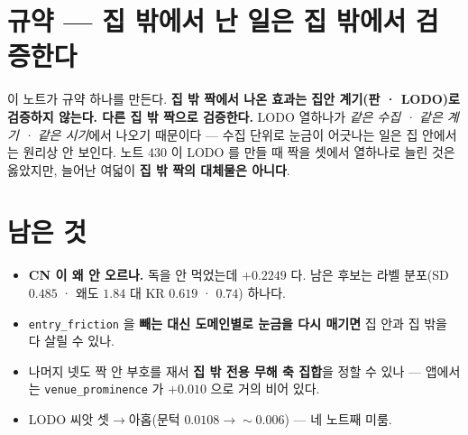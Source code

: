 \documentclass[11pt]{article}
\begin{document}
\section*{규약 --- 집 밖에서 난 일은 집 밖에서 검증한다}

이 노트가 규약 하나를 만든다. \textbf{집 밖 짝에서 나온 효과는 집안
계기(판 · LODO)로 검증하지 않는다. 다른 집 밖 짝으로 검증한다.} LODO
열하나가 \emph{같은 수집 · 같은 계기 · 같은 시기}에서 나오기 때문이다 ---
수집 단위로 눈금이 어긋나는 일은 집 안에서는 원리상 안 보인다. 노트 430 이
LODO 를 만들 때 짝을 셋에서 열하나로 늘린 것은 옳았지만, 늘어난 여덟이
\textbf{집 밖 짝의 대체물은 아니다}.

\section*{남은 것}

\begin{itemize}
\item \textbf{CN 이 왜 안 오르나.} 독을 안 먹었는데 $+0.2249$ 다. 남은
후보는 라벨 분포(SD $0.485$ · 왜도 $1.84$ 대 KR $0.619$ · $0.74$) 하나다.
\item \texttt{entry\_friction} 을 \textbf{빼는 대신 도메인별로 눈금을
다시 매기면} 집 안과 집 밖을 다 살릴 수 있나.
\item 나머지 넷도 짝 안 부호를 재서 \textbf{집 밖 전용 무해 축 집합}을
정할 수 있나 --- 앱에서는 \texttt{venue\_prominence} 가 $+0.010$ 으로 거의
비어 있다.
\item LODO 씨앗 셋$\to$아홉(문턱 $0.0108 \to \sim 0.006$) --- 네 노트째
미룸.
\end{itemize}
\end{document}
